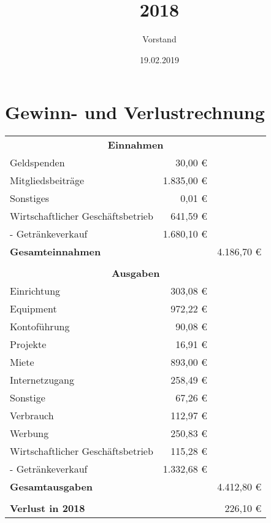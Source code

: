\documentclass{scrartcl}%
\begin{document}
\subject{Finanzbericht}%
\title{2018}%
\subtitle{}%
\author{Vorstand}%
\date{19.02.2019}%
\publishers{vspace.one e.V.}%
\maketitle%
\tableofcontents
\section{Gewinn- und Verlustrechnung}

\begin{tabular}{|l r r|}
\hline
\multicolumn{3}{|c|}{\textbf{Einnahmen}} \\
Geldspenden                         & 30,00 €	    & \\
Mitgliedsbeiträge                   & 1.835,00 €	& \\
Sonstiges                           & 0,01 €	    & \\
Wirtschaftlicher Geschäftsbetrieb	& 641,59 €	    & \\
- Getränkeverkauf	                & 1.680,10 €	& \\
\textbf{Gesamteinnahmen}            &               & 4.186,70 €   \\
&&\\	
\multicolumn{3}{|c|}{\textbf{Ausgaben}} \\		
Einrichtung	                        & 303,08 €	    & \\
Equipment	                        & 972,22 €	    & \\
Kontoführung	                    & 90,08 €	    & \\
Projekte	                        & 16,91 €	    & \\
Miete	                            & 893,00 €      & \\
Internetzugang	                    & 258,49 €	    & \\
Sonstige                            & 67,26 €	    & \\
Verbrauch	                        & 112,97 €	    & \\
Werbung	                            & 250,83 €	    & \\
Wirtschaftlicher Geschäftsbetrieb	& 115,28 €	    & \\
- Getränkeverkauf	                & 1.332,68 €	& \\
\textbf{Gesamtausgaben}             &               & 4.412,80 € \\
&&\\
\textbf{Verlust in 2018}            &               & 226,10 € \\
\hline
\end{tabular}
\end{document}
